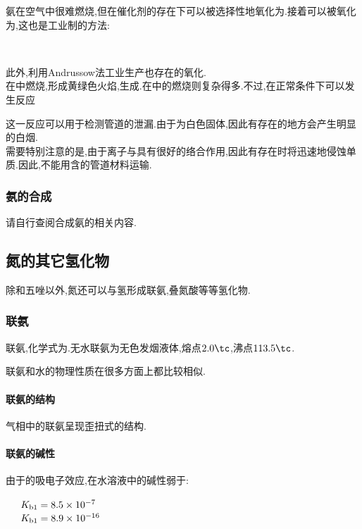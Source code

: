 \documentclass{ctexart}
\begin{document}
\indent 氨在空气中很难燃烧,但在催化剂的存在下可以被选择性地氧化为.接着可以被氧化为,这也是工业制的方法:
\begin{center}
    \\
\end{center}
此外,利用Andrussow法工业生产也存在的氧化.\\
\indent {}在中燃烧,形成黄绿色火焰,生成.在中的燃烧则复杂得多.不过,在正常条件下可以发生反应
\begin{center}
\end{center}
这一反应可以用于检测管道的泄漏.由于为白色固体,因此有存在的地方会产生明显的白烟.\\
\indent 需要特别注意的是,由于离子与具有很好的络合作用,因此有存在时将迅速地侵蚀单质.因此,不能用含的管道材料运输.
\subsubsection{氨的合成}
请自行查阅合成氨的相关内容.
\subsection{氮的其它氢化物}
除和五唑以外,氮还可以与氢形成联氨,叠氮酸等等氢化物.
\subsubsection{联氨}
\begin{substance}[\ce{N2H4}]
    联氨,化学式为.无水联氨为无色发烟液体,熔点$2.0\tc$,沸点$113.5\tc$.
\end{substance}
联氨和水的物理性质在很多方面上都比较相似.
\paragraph{联氨的结构}
气相中的联氨呈现歪扭式的结构.
\paragraph{联氨的碱性}
由于的吸电子效应,在水溶液中的碱性弱于:
\begin{center}
    \ \ \ $K_{\text b1}=8.5\times10^{-7}$\\
    \ \ \ $K_{\text b1}=8.9\times10^{-16}$
\end{center}
\end{document}
